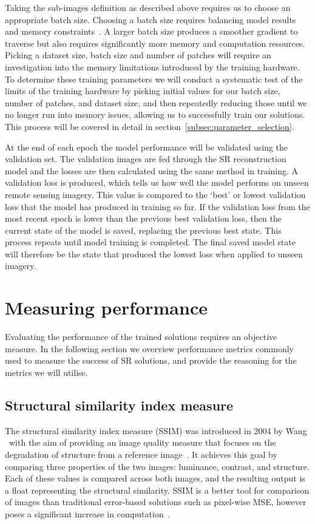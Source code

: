 Taking the sub-images definition as described above requires us to choose an appropriate batch size. Choosing a batch size requires balancing model results and memory constraints~\cite{batchSizeTest}. A larger batch size produces a smoother gradient to traverse but also requires significantly more memory and computation resources. Picking a dataset size, batch size and number of patches will require an investigation into the memory limitations introduced by the training hardware. To determine these training parameters we will conduct a systematic test of the limits of the training hardware by picking initial values for our batch size, number of patches, and dataset size, and then repeatedly reducing those until we no longer run into memory issues, allowing us to successfully train our solutions. This process will be covered in detail in section~\ref{subsec:parameter_selection}.

At the end of each epoch the model performance will be validated using the validation set. The validation images are fed through the SR reconstruction model and the losses are then calculated using the same method in training. A validation loss is produced, which tells us how well the model performs on unseen remote sensing imagery. This value is compared to the `best' or lowest validation loss that the model has produced in training so far. If the validation loss from the most recent epoch is lower than the previous best validation loss, then the current state of the model is saved, replacing the previous best state. This process repeats until model training is completed. The final saved model state will therefore be the state that produced the lowest loss when applied to unseen imagery.

\section{Measuring performance}\label{sec:measuring_performance}
Evaluating the performance of the trained solutions requires an objective measure. In the following section we overview performance metrics commonly used to measure the success of SR solutions, and provide the reasoning for the metrics we will utilise.

\subsection{Structural similarity index measure}
The structural similarity index measure (SSIM) was introduced in 2004 by Wang \etal\ with the aim of providing an image quality measure that focuses on the degradation of structure from a reference image~\cite{ssim}. It achieves this goal by comparing three properties of the two images: luminance, contrast, and structure. Each of these values is compared across both images, and the resulting output is a float representing the structural similarity. SSIM is a better tool for comparison of images than traditional error-based solutions such as pixel-wise MSE, however poses a significant increase in computation~\cite{ssim}.

